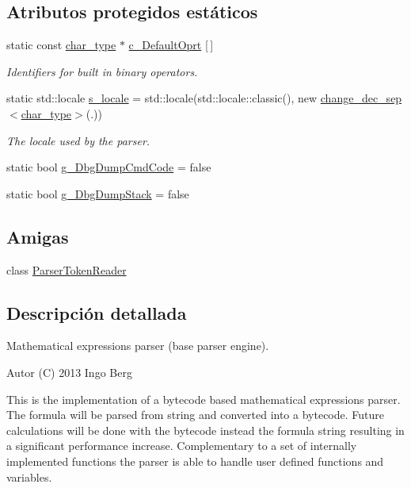 \subsection*{Atributos protegidos estáticos}
\begin{DoxyCompactItemize}
\item 
static const \hyperlink{namespacemu_a81cc89a81a8872430ab1799b5848c5ca}{char\+\_\+type} $\ast$ \hyperlink{classmu_1_1_parser_base_a0cb4d456e6a82da96786ec73044470ea}{c\+\_\+\+Default\+Oprt} \mbox{[}$\,$\mbox{]}
\begin{DoxyCompactList}\small\item\em Identifiers for built in binary operators. \end{DoxyCompactList}\item 
static std\+::locale \hyperlink{classmu_1_1_parser_base_ad594b199c33edf6962ba0e21010bc86e}{s\+\_\+locale} = std\+::locale(std\+::locale\+::classic(), new \hyperlink{classmu_1_1_parser_base_1_1change__dec__sep}{change\+\_\+dec\+\_\+sep}$<$\hyperlink{namespacemu_a81cc89a81a8872430ab1799b5848c5ca}{char\+\_\+type}$>$(\textquotesingle{}.\textquotesingle{}))
\begin{DoxyCompactList}\small\item\em The locale used by the parser. \end{DoxyCompactList}\item 
static bool \hyperlink{classmu_1_1_parser_base_abe673a44e0ea620656422657cb3f6518}{g\+\_\+\+Dbg\+Dump\+Cmd\+Code} = false
\item 
static bool \hyperlink{classmu_1_1_parser_base_a35349445f839ab8bc2cfb54488c45267}{g\+\_\+\+Dbg\+Dump\+Stack} = false
\end{DoxyCompactItemize}
\subsection*{Amigas}
\begin{DoxyCompactItemize}
\item 
class \hyperlink{classmu_1_1_parser_base_a4a4908a2dc2cc3723b45602a3e722f79}{Parser\+Token\+Reader}
\end{DoxyCompactItemize}


\subsection{Descripción detallada}
Mathematical expressions parser (base parser engine). 

\begin{DoxyAuthor}{Autor}
(C) 2013 Ingo Berg
\end{DoxyAuthor}
This is the implementation of a bytecode based mathematical expressions parser. The formula will be parsed from string and converted into a bytecode. Future calculations will be done with the bytecode instead the formula string resulting in a significant performance increase. Complementary to a set of internally implemented functions the parser is able to handle user defined functions and variables. 

